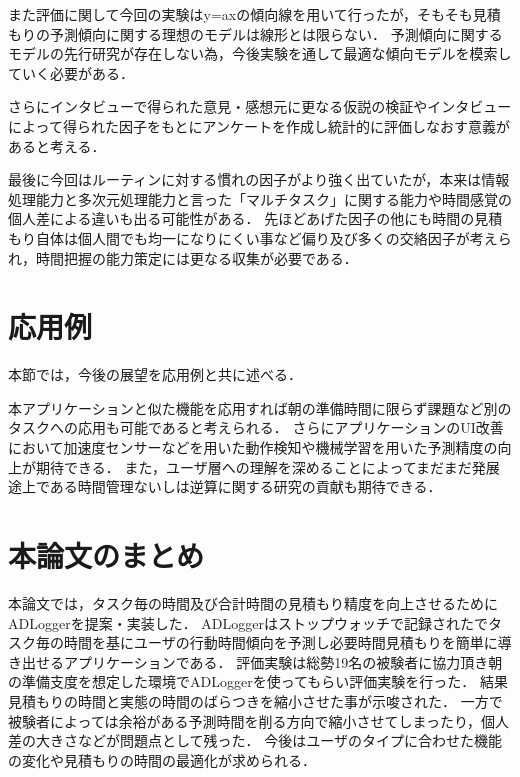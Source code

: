 また評価に関して今回の実験はy=axの傾向線を用いて行ったが，そもそも見積もりの予測傾向に関する理想のモデルは線形とは限らない．
予測傾向に関するモデルの先行研究が存在しない為，今後実験を通して最適な傾向モデルを模索していく必要がある．

さらにインタビューで得られた意見・感想元に更なる仮説の検証やインタビューによって得られた因子をもとにアンケートを作成し統計的に評価しなおす意義があると考える．

最後に今回はルーティンに対する慣れの因子がより強く出ていたが，本来は情報処理能力と多次元処理能力と言った「マルチタスク」に関する能力\cite{multitask}や時間感覚\cite{Tayama2018}の個人差による違いも出る可能性がある．
先ほどあげた因子の他にも時間の見積もり自体は個人間でも均一になりにくい事など偏り及び多くの交絡因子が考えられ，時間把握の能力策定には更なる収集が必要である．

\section{応用例}
本節では，今後の展望を応用例と共に述べる．

本アプリケーションと似た機能を応用すれば朝の準備時間に限らず課題など別のタスクへの応用も可能であると考えられる．
さらにアプリケーションのUI改善において加速度センサーなどを用いた動作検知や機械学習を用いた予測精度の向上が期待できる．
また，ユーザ層への理解を深めることによってまだまだ発展途上である時間管理ないしは逆算に関する研究の貢献も期待できる．
\section{本論文のまとめ}
本論文では，タスク毎の時間及び合計時間の見積もり精度を向上させるためにADLoggerを提案・実装した．
ADLoggerはストップウォッチで記録されたでタスク毎の時間を基にユーザの行動時間傾向を予測し必要時間見積もりを簡単に導き出せるアプリケーションである．
評価実験は総勢19名の被験者に協力頂き朝の準備支度を想定した環境でADLoggerを使ってもらい評価実験を行った．
結果見積もりの時間と実態の時間のばらつきを縮小させた事が示唆された．
一方で被験者によっては余裕がある予測時間を削る方向で縮小させてしまったり，個人差の大きさなどが問題点として残った．
今後はユーザのタイプに合わせた機能の変化や見積もりの時間の最適化が求められる．